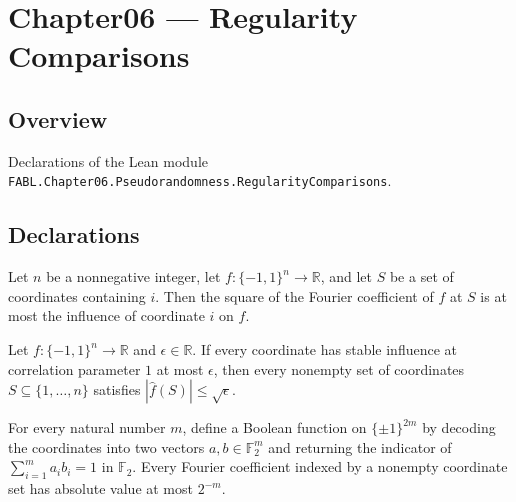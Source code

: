 \chapter{Chapter06 — Regularity Comparisons}
\section{Overview}

Declarations of the Lean module \texttt{FABL.Chapter06.Pseudorandomness.RegularityComparisons}.

\section{Declarations}

\begin{theorem}
\label{FABL.sq_fourierCoeff_le_influence_of_mem}
\leanok
{}
Let $n$ be a nonnegative integer, let $f:\{-1,1\}^n\to\mathbb R$, and let $S$ be a
set of coordinates containing $i$. Then the square of the Fourier coefficient of $f$ at
$S$ is at most the influence of coordinate $i$ on $f$.
\end{theorem}

\begin{theorem}
\label{FABL.HasSmallInfluences.isFourierRegular_sqrt}
\leanok
{}
Let $f:\{-1,1\}^n\to\mathbb R$ and $\epsilon\in\mathbb R$. If every coordinate has
stable influence at correlation parameter $1$ at most $\epsilon$, then every nonempty
set of coordinates $S\subseteq\{1,\ldots,n\}$ satisfies $|\widehat
f(S)|\le\sqrt{\epsilon}$.
\end{theorem}

\begin{theorem}
\label{FABL.isFourierRegular_innerProductModTwoBoolean}
\leanok
{}
For every natural number $m$, define a Boolean function on $\{\pm1\}^{2m}$ by decoding
the coordinates into two vectors $a,b\in\mathbb F_2^m$ and returning the indicator of
$\sum_{i=1}^m a_i b_i=1$ in $\mathbb F_2$. Every Fourier coefficient indexed by a
nonempty coordinate set has absolute value at most $2^{-m}$.
\end{theorem}

